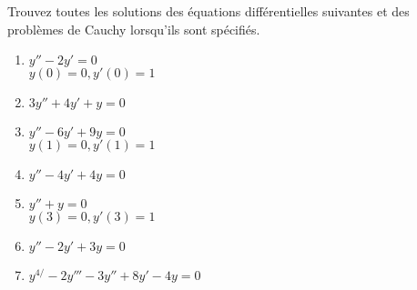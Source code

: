 
\begin{exercice}\label{exoEqsDiff0006}

Trouvez toutes les solutions des équations différentielles suivantes et des problèmes de Cauchy lorsqu'ils sont spécifiés.
\begin{multicols}{2}
\begin{enumerate}
\item
$y'' - 2y' = 0$\\
$y(0) = 0, y'(0)=1$
\item 
$  3y'' +4y' +y = 0 $
\item
 $ y'' - 6y' + 9y = 0$ \\
$y(1) = 0, y'(1)=1$
\item 
$  y'' - 4y' + 4y = 0  $
\item 
$y'' + y = 0$ \\
$y(3) = 0, y'(3)=1 $
\item
 $  y'' -2y' + 3y = 0 $
\item
 $  y^{4/} - 2y''' - 3y'' + 8y' - 4y = 0 $
\end{enumerate}
\end{multicols}

\end{exercice}
